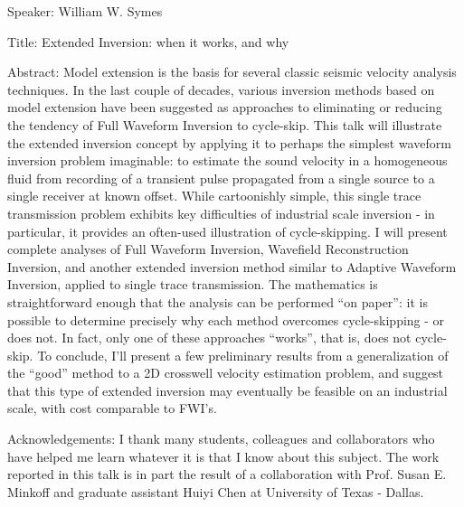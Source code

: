 Speaker: William W. Symes

Title: Extended Inversion: when it works, and why

Abstract: Model extension is the basis for several classic seismic velocity analysis techniques. In the last couple of decades, various inversion methods based on model extension have been suggested as approaches to eliminating or reducing the tendency of Full Waveform Inversion to cycle-skip. This talk will illustrate the extended inversion concept by applying it to perhaps the simplest waveform inversion problem imaginable: to estimate the sound velocity in a homogeneous fluid from recording of a transient pulse propagated from a single source to a single receiver at known offset.  While cartoonishly simple, this single trace transmission problem exhibits key difficulties of industrial scale inversion - in particular, it provides an often-used illustration of cycle-skipping. I will present complete analyses of Full Waveform Inversion, Wavefield Reconstruction Inversion, and another extended inversion method similar to Adaptive Waveform Inversion, applied to single trace transmission. The mathematics is straightforward enough that the analysis can be performed ``on paper'': it is possible to determine precisely why each method overcomes cycle-skipping - or does not. In fact, only one of these approaches ``works'', that is, does not cycle-skip. To conclude, I'll present a few preliminary results from a generalization of the ``good'' method to a 2D crosswell velocity estimation problem, and suggest that this type of extended inversion may eventually be feasible on an industrial scale, with cost comparable to FWI's.

Acknowledgements: I thank many students, colleagues and collaborators who have helped me learn whatever it is that I know about this subject. The work reported in this talk is in part the result of a collaboration with Prof. Susan E. Minkoff and graduate assistant Huiyi Chen at University of Texas - Dallas.
